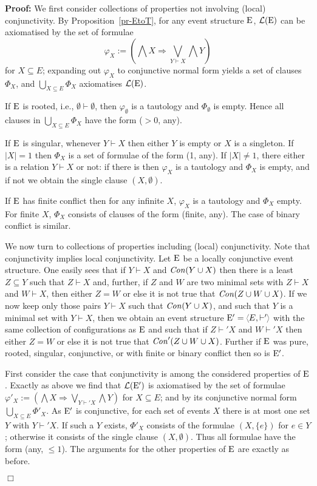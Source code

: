 \documentclass[twocolumn]{article}
\newenvironment{proof}{\begin{trivlist} \item[\hspace{\labelsep}\bf
Proof:]}{\hfill $\Box$\end{trivlist}}
\newcommand{\pr}[1]{Proposition~\ref{pr-#1}}
\newcommand{\turn}{\vdash}                              \newcommand{\dbigcup}{\bigcup_{\uparrow}}		\newcommand{\nbigcup}{\bigcup_{\bullet}}		\newcommand{\nbigcap}{\bigcap_{\bullet}}		\newcommand{\bbigcup}{\overline{\bigcup}}		\newcommand{\bbigcap}{\overline{\bigcap}}		\newcommand{\nbbigcap}{\bbigcap_{\bullet}}		\newcommand{\fbbigcup}{\overline{\bigcup}^f}		\newcommand{\bbbigcup}{\overline{\bigcup}^2}		\newcommand{\dcup}{~~\makebox[0pt]{\LARGE$\cdot$}\makebox[0pt]{$\cup$}~~}
\begin{document}
\begin{proof}
We first consider collections of properties not involving
(local) conjunctivity. By \pr{EtoT}, for any event structure ${\rm E}$,
${\cal L}({\rm E})$ can be axiomatised by the set of formulae 
$$\varphi_X := (\bigwedge X \Rightarrow \bigvee_{Y\turn X} \bigwedge Y)$$ 
for $X \subseteq E$;
expanding out $\varphi_X$ to conjunctive normal form yields a set of
clauses $\Phi_X$, and $\bigcup_{X\subseteq E}\Phi_X$ axiomatises ${\cal L}({\rm E})$.

If ${\rm E}$ is rooted, i.e., $\emptyset\turn\emptyset$, then $\varphi_{\emptyset}$
is a tautology and $\Phi_{\emptyset}$ is empty. Hence all clauses in
$\bigcup_{X\subseteq E}\Phi_X$ have the form ($>\!0$, any).

If ${\rm E}$ is singular, whenever $Y \turn X$ then either $Y$ is empty or
$X$ is a singleton. If $|X|=1$ then $\Phi_X$ is a set of formulae
of the form (1, any). If $|X|\neq 1$, there either is a relation
$Y \turn X$ or not: if there is then $\varphi_X$ is a tautology and
$\Phi_X$ is empty, and if not we obtain the single clause $(X,\emptyset)$.

If ${\rm E}$ has finite conflict then for any infinite $X$, $\varphi_X$ is
a tautology and $\Phi_X$ empty. For finite $X$, $\Phi_X$ consists of
clauses of the form (finite, any).  The case of binary conflict is
similar.

We now turn to collections of properties including (local) conjunctivity.
Note that conjunctivity implies local conjunctivity.
Let ${\rm E}$ be a locally conjunctive event structure.  One easily sees
that if $Y \turn X$ and ${\it Con}(Y \cup X)$ then there is a least $Z
\subseteq Y$ such that $Z \turn X$ and, further, if $Z$ and $W$ are
two minimal sets with $Z\turn X$ and $W\turn X$, then either $Z = W$
or else it is not true that ${\it Con}(Z\cup W \cup X)$.  If we now keep
only those pairs $Y \turn X$ such that ${\it Con}(Y \cup X)$, and such that $Y$ is a
minimal set with $Y \turn X$, then we obtain an event structure
$\eE' = \tuple{E,\turn'\;}$ with the same collection of configurations
as ${\rm E}$ and such that if $Z \turn' X$ and $W \turn' X$ then either $Z
= W$ or else it is not true that ${\it Con}'(Z \cup W \cup X)$.  Further if
${\rm E}$ was pure, rooted, singular, conjunctive, or with finite or binary
conflict then so is ${\rm E}'$.

First consider the case that conjunctivity is among the considered
properties of ${\rm E}$. Exactly as above we find that ${\cal L}({\rm E}')$ is
axiomatised by the set of formulae $\varphi'_X := (\bigwedge X \Rightarrow
\bigvee_{Y\turn' X} \bigwedge Y)$ for $X \subseteq E$; and by its
conjunctive normal form $\bigcup_{X\subseteq E}\Phi'_X$.
As ${\rm E}'$ is conjunctive, for each set of events $X$ there is at most
one set $Y$ with $Y\turn' X$. If such a $Y$ exists, $\Phi'_X$ consists
of the formulae $(X,\{e\})$ for $e \in Y$; otherwise it consists of the
single clause $(X,\emptyset)$. Thus all formulae have the form (any,
$\leq\!1$). The arguments for the other properties of ${\rm E}$ are exactly
as before.


\end{proof}
\end{document}
